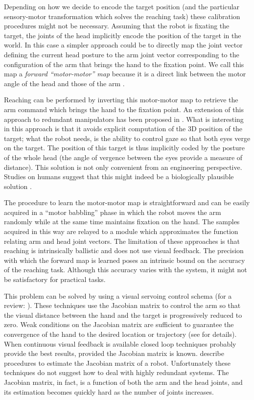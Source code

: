 Depending on how we decide to encode the target position (and the 
particular sensory-motor transformation which solves the reaching task)
these calibration procedures might not be necessary. Assuming that 
the robot is fixating the target, the joints of the head implicitly 
encode the position of the target in the world. In this case a simpler 
approach could be to directly map the joint vector defining the current 
head posture to the arm joint vector corresponding to the configuration 
of the arm that brings the hand to the fixation point. We call this map 
a {\em forward ``motor-motor'' map} because it is a direct link between the motor 
angle of the head and those of the arm 
\cite{blackburn94learning,metta99developmental}. 

Reaching can be performed by inverting this motor-motor 
map to retrieve the arm command which brings the hand to the fixation 
point. An extension of this approach to redundant manipulators has
been proposed in \cite{lopes06learning}. What is interesting in this 
approach is that it avoids explicit computation of the 3D position 
of the target; what the robot needs, is the ability to control gaze
so that both eyes verge on the target. The position of 
this target is thus implicitly coded by the posture of the whole head (the 
angle of vergence between the eyes provide a measure of distance). 
This solution is not only convenient from an engineering perspective. Studies 
on humans suggest that this might indeed be a biologically plausible 
solution \cite{flanders-daghestani-berthoz-1999}.

The procedure to learn the motor-motor map is straightforward and can be 
easily acquired in a ``motor babbling'' phase in which the robot moves 
the arm randomly while at the same time maintains fixation on the hand. 
The samples acquired in this way are relayed to a module which 
approximates the function relating arm and head joint vectors. The 
limitation of these approaches is that reaching
is intrinsically ballistic and does not use visual feedback. The precision 
with which the forward map is learned poses an intrinsic bound on
the accuracy of the reaching task. Although this accuracy varies with the
system, it might not be satisfactory for practical tasks.

This problem can be solved by using a visual servoing control schema (for a 
review: \cite{hutchinson96tutorial}). These techniques use the 
Jacobian matrix to control the arm so that the visual distance between the 
hand and the target is progressively reduced to zero. Weak conditions 
on the Jacobian matrix are sufficient to guarantee the convergence 
of the hand to the desired location or trajectory (see \cite{Samson91robot} for details). When continuous visual 
feedback is available closed loop techniques probably provide the best 
results, provided the Jacobian matrix is known. \cite{Hosoda94versatile,Mansard06jacobian,Lapreste04efficient} 
describe procedures to estimate the Jacobian matrix of a robot. Unfortunately 
these techniques do not suggest how to deal with highly redundant systems.
The Jacobian matrix, in fact, is a function
of both the arm and the head joints, and its estimation becomes
quickly hard as the number of joints increases.

